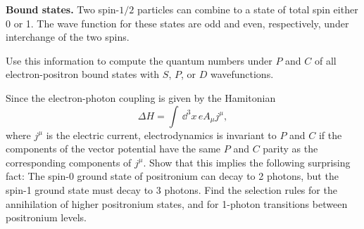 \problem \textbf{Bound states.} Two spin-$1/2$ particles can combine to a state of total spin either 0 or 1. The 
wave function for these states are odd and even, respectively, under interchange of the two spins.
\begin{problembody}
    \item Use this information to compute the quantum numbers under $P$ and $C$ of all electron-positron
    bound states with $S$, $P$, or $D$ wavefunctions.

    \item Since the electron-photon coupling is given by the Hamitonian
    \begin{equation*}
        \Delta H = \int \, \dd^3x \, e A_\mu j^\mu,
    \end{equation*}
    where $j^\mu$ is the electric current, electrodynamics is invariant to $P$ and $C$ if the components of the vector
    potential have the same $P$ and $C$ parity as the corresponding components of $j^\mu$. Show that this implies the
    following surprising fact: The spin-0 ground state of positronium can decay to 2 photons, but the spin-1 ground state
    must decay to 3 photons. Find the selection rules for the annihilation of higher positronium states, and for 1-photon
    transitions between positronium levels.
\end{problembody}

